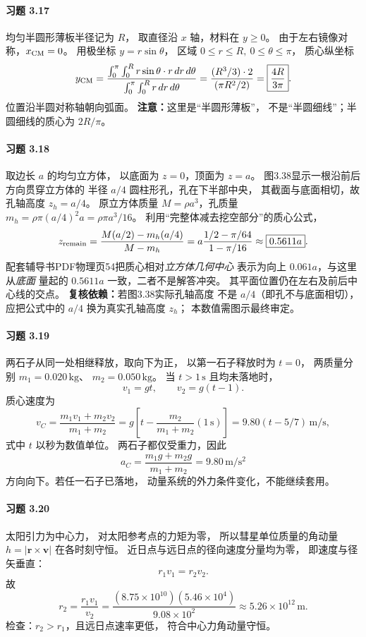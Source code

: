 \paragraph{习题 3.17}
均匀半圆形薄板半径记为 \(R\)，
取直径沿 \(x\) 轴，材料在 \(y\ge0\)。
由于左右镜像对称，\(x_{\rm CM}=0\)。
用极坐标 \(y=r\sin\theta\)，
区域 \(0\le r\le R,\ 0\le\theta\le\pi\)，
质心纵坐标
\[
 y_{\rm CM}=
 \frac{\int_0^\pi\int_0^R
 r\sin\theta\cdot r\,dr\,d\theta}
 {\int_0^\pi\int_0^Rr\,dr\,d\theta}
 =\frac{(R^3/3)\cdot2}{(\pi R^2/2)}
 =\boxed{\frac{4R}{3\pi}}.
\]
位置沿半圆对称轴朝向弧面。
\textbf{注意：}这里是“半圆形薄板”，
不是“半圆细线”；半圆细线的质心为 \(2R/\pi\)。

\paragraph{习题 3.18}
取边长 \(a\) 的均匀立方体，
以底面为 \(z=0\)，顶面为 \(z=a\)。
图3.38显示一根沿前后方向贯穿立方体的
半径 \(a/4\) 圆柱形孔，孔在下半部中央，
其截面与底面相切，故孔轴高度 \(z_h=a/4\)。
原立方体质量
\(M=\rho a^3\)，孔质量
\(m_h=\rho\pi(a/4)^2a=\rho\pi a^3/16\)。
利用“完整体减去挖空部分”的质心公式，
\[
 z_{\rm remain}
 =\frac{M(a/2)-m_h(a/4)}{M-m_h}
 =a\frac{1/2-\pi/64}{1-\pi/16}
 \approx\boxed{0.5611a}.
\]
配套辅导书PDF物理页54把质心相对\emph{立方体几何中心}
表示为向上 \(0.061a\)，与这里从\emph{底面}
量起的 \(0.5611a\) 一致，二者不是解答冲突。
其平面位置仍在左右及前后中心线的交点。
\textbf{复核依赖：}若图3.38实际孔轴高度
不是 \(a/4\)（即孔不与底面相切），
应把公式中的 \(a/4\) 换为真实孔轴高度 \(z_h\)；
本数值需图示最终审定。

\paragraph{习题 3.19}
两石子从同一处相继释放，取向下为正，
以第一石子释放时为 \(t=0\)，
两质量分别
\(m_1=0.020\,\mathrm{kg}\)、
\(m_2=0.050\,\mathrm{kg}\)。
当 \(t>1\,\mathrm s\) 且均未落地时，
\[
 v_1=gt,\qquad v_2=g(t-1).
\]
质心速度为
\[
 v_C=\frac{m_1v_1+m_2v_2}{m_1+m_2}
 =g\left[t-\frac{m_2}{m_1+m_2}(1\,\mathrm s)\right]
 =\boxed{9.80(t-5/7)\,\mathrm{m/s}},
\]
式中 \(t\) 以秒为数值单位。
两石子都仅受重力，因此
\[
 \boxed{a_C=\frac{m_1g+m_2g}{m_1+m_2}
 =9.80\,\mathrm{m/s^2}}
\]
方向向下。若任一石子已落地，
动量系统的外力条件变化，不能继续套用。

\paragraph{习题 3.20}
太阳引力为中心力，
对太阳参考点的力矩为零，
所以彗星单位质量的角动量
\(h=|\boldsymbol r\times\boldsymbol v|\)
在各时刻守恒。
近日点与远日点的径向速度分量均为零，
即速度与径矢垂直：
\[
 r_1v_1=r_2v_2.
\]
故
\[
 \boxed{r_2=\frac{r_1v_1}{v_2}
 =\frac{(8.75\times10^{10})(5.46\times10^4)}
 {9.08\times10^2}
 \approx5.26\times10^{12}\,\mathrm m}.
\]
检查：\(r_2>r_1\)，且远日点速率更低，
符合中心力角动量守恒。



